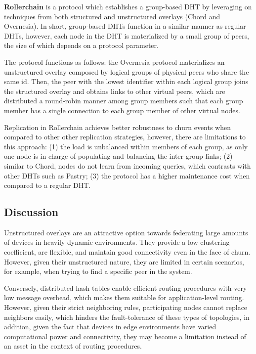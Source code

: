 \textbf{Rollerchain} \cite{rollerchain} is a protocol which establishes a group-based DHT by leveraging on techniques from both structured and unstructured  overlays (Chord and Overnesia). In short, group-based DHTs function in a similar manner as regular DHTs, however, each node in the DHT is materialized by a small group of peers,
the size of which depends on a protocol parameter. 

The protocol functions as follows: the Overnesia protocol materializes an unstructured overlay composed by logical
groups of physical peers who share the same id. Then, the peer with the lowest identifier within each logical group
joins the structured overlay and obtains links to other virtual peers, which are distributed a round-robin manner among group members such that each group member has a single connection to each group member of other virtual nodes.

Replication in Rollerchain achieves better robustness to churn events when compared to other other replication strategies,
however, there are limitations to this approach: (1) the load is unbalanced within members of each group, as only one node  is in charge of populating and balancing the inter-group links; (2) similar to Chord, nodes do not learn from incoming queries, which contrasts with other DHTs such as Pastry; (3) the protocol has a higher maintenance cost when compared to a regular DHT.

\subsection{Discussion}

Unstructured overlays are an attractive option towards federating large amounts of devices in heavily dynamic environments. They provide a low clustering coefficient, are flexible, and maintain good connectivity even in the face of churn. However, given their unstructured nature, they are limited in certain scenarios, for example, when trying to find a specific peer in the system.

Conversely, distributed hash tables enable efficient routing procedures with very low message overhead, which makes them suitable for application-level routing. However, given their strict neighboring rules, participating nodes cannot replace neighbors easily, which hinders the fault-tolerance of these types of topologies, in addition, given the fact that devices in edge environments have varied computational power and connectivity, they may become a limitation instead of an asset in the context of routing procedures. 




